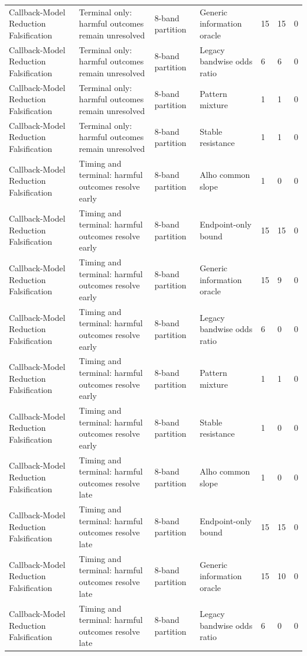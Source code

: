 \begin{tabular}{lllllll}
Callback-Model Reduction Falsification & Terminal only: harmful outcomes remain unresolved & 8-band partition & Generic information oracle & 15 & 15 & 0 \\
Callback-Model Reduction Falsification & Terminal only: harmful outcomes remain unresolved & 8-band partition & Legacy bandwise odds ratio & 6 & 6 & 0 \\
Callback-Model Reduction Falsification & Terminal only: harmful outcomes remain unresolved & 8-band partition & Pattern mixture & 1 & 1 & 0 \\
Callback-Model Reduction Falsification & Terminal only: harmful outcomes remain unresolved & 8-band partition & Stable resistance & 1 & 1 & 0 \\
Callback-Model Reduction Falsification & Timing and terminal: harmful outcomes resolve early & 8-band partition & Alho common slope & 1 & 0 & 0 \\
Callback-Model Reduction Falsification & Timing and terminal: harmful outcomes resolve early & 8-band partition & Endpoint-only bound & 15 & 15 & 0 \\
Callback-Model Reduction Falsification & Timing and terminal: harmful outcomes resolve early & 8-band partition & Generic information oracle & 15 & 9 & 0 \\
Callback-Model Reduction Falsification & Timing and terminal: harmful outcomes resolve early & 8-band partition & Legacy bandwise odds ratio & 6 & 0 & 0 \\
Callback-Model Reduction Falsification & Timing and terminal: harmful outcomes resolve early & 8-band partition & Pattern mixture & 1 & 1 & 0 \\
Callback-Model Reduction Falsification & Timing and terminal: harmful outcomes resolve early & 8-band partition & Stable resistance & 1 & 0 & 0 \\
Callback-Model Reduction Falsification & Timing and terminal: harmful outcomes resolve late & 8-band partition & Alho common slope & 1 & 0 & 0 \\
Callback-Model Reduction Falsification & Timing and terminal: harmful outcomes resolve late & 8-band partition & Endpoint-only bound & 15 & 15 & 0 \\
Callback-Model Reduction Falsification & Timing and terminal: harmful outcomes resolve late & 8-band partition & Generic information oracle & 15 & 10 & 0 \\
Callback-Model Reduction Falsification & Timing and terminal: harmful outcomes resolve late & 8-band partition & Legacy bandwise odds ratio & 6 & 0 & 0 \\

\end{tabular}
